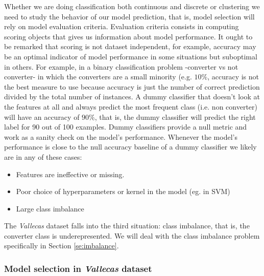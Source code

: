 \documentclass[11pt]{article}
\theoremstyle{definition}
\theoremstyle{remark}
\begin{document}
Whether we are doing classification both continuous and discrete or clustering we need to study the behavior of our model prediction, that is, model selection will rely on model evaluation criteria. Evaluation criteria consists in computing scoring objects that gives us information about model performance. It ought to be remarked that scoring is not dataset independent, for example, accuracy may be an optimal indicator of model performance in some situations but suboptimal in others. For example, in a binary classification problem -converter vs not converter- in which the converters are a small minority (e.g. $10\%$, accuracy is not the best measure to use because accuracy is just the number of correct prediction divided by the total number of instances. A dummy classifier that doesn't look at the features at all and always predict the most frequent class (i.e. non converter) will have an accuracy of $90\%$, that is, the dummy classifier will predict the right label for 90 out of 100 examples. 
Dummy classifiers provide a null metric and work as a sanity check on the model's performance. Whenever the model's performance is close to the null accuracy baseline of a dummy classifier we likely are in any of these cases:
\begin{itemize}
	\item Features are ineffective or missing.
	\item Poor choice of hyperparameters or kernel in the model (eg. in SVM) 
	\item Large class imbalance 
\end{itemize}

The \emph{Vallecas} dataset falls into the third situation: class imbalance, that is, the converter class is underepresented. We will deal with the class imbalance problem specifically in Section \ref{se:imbalance}.

\subsubsection{Model selection in \emph{Vallecas} dataset}
\label{sse:permets}
\end{document}
